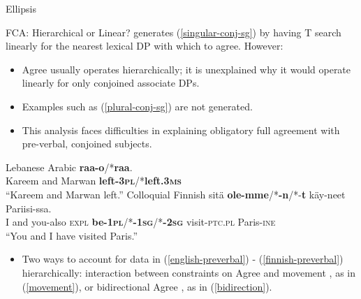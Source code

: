 \documentclass[final]{beamer}
\newlength{\onecolwid}
\newlength{\twocolwid}
\newcommand\barh{\ipabar{h}{1.1ex}{.6}{}{.3}}
\begin{document}
\begin{frame}[t]
\begin{columns}[t]
\begin{column}{\twocolwid}
\begin{columns}[t,totalwidth=\twocolwid]
\begin{column}{\onecolwid}
\begin{block}{Ellipsis}
\begin{itemize}
\end{itemize}
\end{block}

\begin{block}{FCA: Hierarchical or Linear?}\vspace{0.5em}
\cite{Sobin14} generates (\ref{singular-conj-sg}) by having T search linearly for the nearest lexical DP with which to agree. However:
\begin{itemize}
\item Agree usually operates hierarchically; it is unexplained why it would operate linearly for only conjoined associate DPs.
\item Examples such as (\ref{plural-conj-sg}) are not generated.
\item This analysis faces difficulties in explaining obligatory full agreement with pre-verbal, conjoined subjects. 
\end{itemize}\vspace{-0.5em}
\begin{exe}
\label{english-preverbal}
\ex \label{la-preverbal} Lebanese Arabic \citep{Aoun:1994}
\vspace{-.5em}
  \textbf{raa\barh-o}/*\textbf{raa{\barh}}.\\
    Kareem and Marwan \textbf{left-\textsc{3pl}}/*\textbf{left.\textsc{3ms}}\\
    \vspace{-.5em}
    \trans ``Kareem and Marwan left.''
    \ex \label{finnish-preverbal} Colloquial Finnish \citep[85-86]{vanKoppen:2005}
\vspace{-.5em}
     sit\"{a} \textbf{ole-mme}/*\textbf{-n}/*-\textbf{t} k\"{a}y-neet Pariisi-ssa.\\
    I and you-also \textsc{expl} \textbf{be-\textsc{1pl}}/*\textbf{-\textsc{1sg}}/*\textbf{-\textsc{2sg}} visit-\textsc{ptc.pl} Paris-\textsc{ine}\\
    \vspace{-.5em}
    \trans ``You and I have visited Paris.''
\end{exe}\vspace{-0.5em}
\begin{itemize}
\item Two ways to account for data in (\ref{english-preverbal}) - (\ref{finnish-preverbal}) hierarchically: interaction between constraints on Agree and movement \citep{Doron:2000,vanKoppen:2012,Crone:2015}, as in (\ref{movement}), or bidirectional Agree \citep{Baker:2008}, as in (\ref{bidirection}).

\end{itemize}
\end{block}
\end{column}
\end{columns}
\end{column}
\end{columns}
\end{frame}
\end{document}

